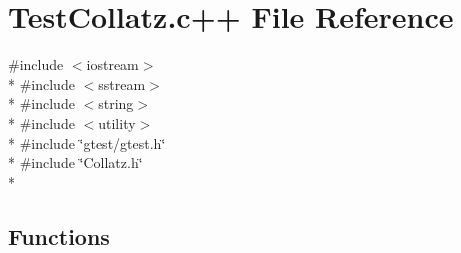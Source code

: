 \hypertarget{TestCollatz_8c_09_09}{\section{Test\-Collatz.\-c++ File Reference}
\label{TestCollatz_8c_09_09}
}
{\ttfamily \#include $<$iostream$>$}\\*
{\ttfamily \#include $<$sstream$>$}\\*
{\ttfamily \#include $<$string$>$}\\*
{\ttfamily \#include $<$utility$>$}\\*
{\ttfamily \#include \char`\"{}gtest/gtest.\-h\char`\"{}}\\*
{\ttfamily \#include \char`\"{}Collatz.\-h\char`\"{}}\\*
\subsection*{Functions}
